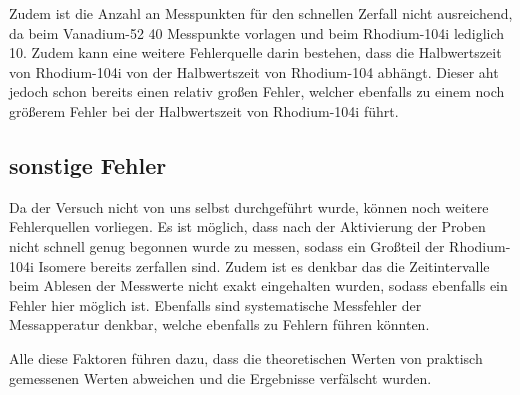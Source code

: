 \noindent
Zudem ist die Anzahl an Messpunkten für den schnellen Zerfall nicht ausreichend, da beim Vanadium-52 40 Messpunkte vorlagen und beim Rhodium-104i lediglich 10. Zudem kann eine weitere Fehlerquelle
darin bestehen, dass die Halbwertszeit von Rhodium-104i von der Halbwertszeit von Rhodium-104 abhängt. Dieser aht jedoch schon bereits einen relativ großen Fehler, welcher ebenfalls zu einem noch größerem
Fehler bei der Halbwertszeit von Rhodium-104i führt.

\subsection{sonstige Fehler}
Da der Versuch nicht von uns selbst durchgeführt wurde, können noch weitere Fehlerquellen vorliegen. Es ist möglich, dass nach der Aktivierung der Proben nicht schnell genug begonnen wurde zu messen, sodass
ein Großteil der Rhodium-104i Isomere bereits zerfallen sind. Zudem ist es denkbar das die Zeitintervalle beim Ablesen der Messwerte nicht exakt eingehalten wurden, sodass ebenfalls ein Fehler hier möglich ist.
Ebenfalls sind systematische Messfehler der Messapperatur denkbar, welche ebenfalls zu Fehlern führen könnten.

\noindent
Alle diese Faktoren führen dazu, dass die theoretischen Werten von praktisch gemessenen Werten abweichen und die Ergebnisse verfälscht wurden.
